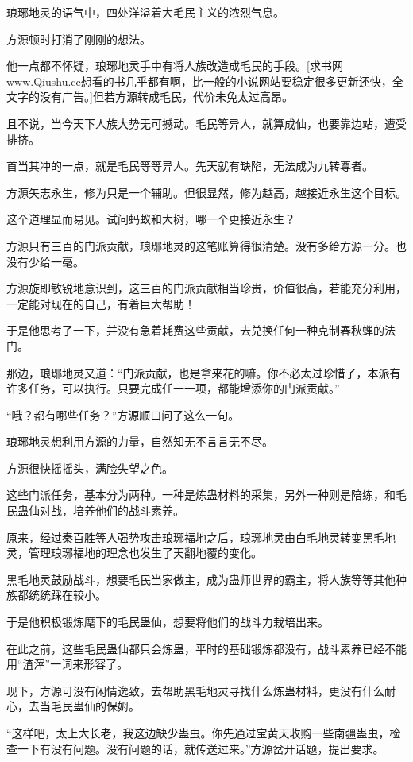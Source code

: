 \begin{this_body}
琅琊地灵的语气中，四处洋溢着大毛民主义的浓烈气息。

方源顿时打消了刚刚的想法。

他一点都不怀疑，琅琊地灵手中有将人族改造成毛民的手段。[求书网www.Qiushu.cc想看的书几乎都有啊，比一般的小说网站要稳定很多更新还快，全文字的没有广告。]但若方源转成毛民，代价未免太过高昂。

且不说，当今天下人族大势无可撼动。毛民等异人，就算成仙，也要靠边站，遭受排挤。

首当其冲的一点，就是毛民等等异人。先天就有缺陷，无法成为九转尊者。

方源矢志永生，修为只是一个辅助。但很显然，修为越高，越接近永生这个目标。

这个道理显而易见。试问蚂蚁和大树，哪一个更接近永生？

方源只有三百的门派贡献，琅琊地灵的这笔账算得很清楚。没有多给方源一分。也没有少给一毫。

方源旋即敏锐地意识到，这三百的门派贡献相当珍贵，价值很高，若能充分利用，一定能对现在的自己，有着巨大帮助！

于是他思考了一下，并没有急着耗费这些贡献，去兑换任何一种克制春秋蝉的法门。

那边，琅琊地灵又道：“门派贡献，也是拿来花的嘛。你不必太过珍惜了，本派有许多任务，可以执行。只要完成任一一项，都能增添你的门派贡献。”

“哦？都有哪些任务？”方源顺口问了这么一句。

琅琊地灵想利用方源的力量，自然知无不言言无不尽。

方源很快摇摇头，满脸失望之色。

这些门派任务，基本分为两种。一种是炼蛊材料的采集，另外一种则是陪练，和毛民蛊仙对战，培养他们的战斗素养。

原来，经过秦百胜等人强势攻击琅琊福地之后，琅琊地灵由白毛地灵转变黑毛地灵，管理琅琊福地的理念也发生了天翻地覆的变化。

黑毛地灵鼓励战斗，想要毛民当家做主，成为蛊师世界的霸主，将人族等等其他种族都统统踩在较小。

于是他积极锻炼麾下的毛民蛊仙，想要将他们的战斗力栽培出来。

在此之前，这些毛民蛊仙都只会炼蛊，平时的基础锻炼都没有，战斗素养已经不能用“渣滓”一词来形容了。

现下，方源可没有闲情逸致，去帮助黑毛地灵寻找什么炼蛊材料，更没有什么耐心，去当毛民蛊仙的保姆。

“这样吧，太上大长老，我这边缺少蛊虫。你先通过宝黄天收购一些南疆蛊虫，检查一下有没有问题。没有问题的话，就传送过来。”方源岔开话题，提出要求。


\end{this_body}
